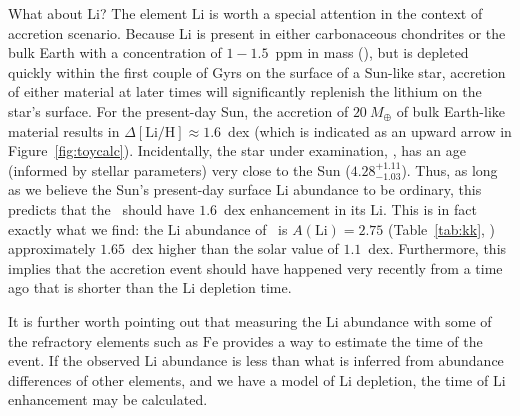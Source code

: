 \documentclass[manuscript]{aastex6}
\newcommand{\figname}{Figure}
\newcommand*\elem[1]{\ensuremath{\mathrm{#1}}}
\newcommand*\elemH[1]{\ensuremath{[\mathrm{#1}/\elem{H}]}}
\newcommand{\bizarreone}{\text{Kronos}}
\newcommand{\mearth}{\ensuremath{M_\oplus}}
\begin{document}

What about \elem{Li}?
The element \elem{Li} is worth a special attention in the context of accretion scenario.
Because Li is present in either carbonaceous chondrites or the bulk Earth with
a concentration of $1-1.5$~ppm in mass (\citealt{mcdonough2001composition}),
but is depleted quickly within the first couple of Gyrs on the surface of a
Sun-like star, accretion of either material at later times will significantly
replenish the lithium on the star's surface.
For the present-day Sun, the accretion of $20~\mearth$ of bulk Earth-like
material results in $\Delta\elemH{Li} \approx 1.6$~dex (which
is indicated as an upward arrow in \figname~\ref{fig:toycalc}).
Incidentally, the star under examination, \bizarreone, has an age (informed by
stellar parameters) very close to the Sun ($4.28_{-1.03}^{+1.11}$).
Thus, as long as we believe the Sun's present-day surface \elem{Li} abundance
to be ordinary, this predicts that the \bizarreone\ should have $1.6$~dex enhancement
in its \elem{Li}.
This is in fact exactly what we find: the \elem{Li} abundance of \bizarreone\ is
$A(\elem{Li}) = 2.75$ (Table~\ref{tab:kk}, \citealt{jmlithium})
approximately $1.65$~dex higher than the solar value of $1.1$~dex.
Furthermore, this implies that the accretion event should have happened very
recently from a time ago that is shorter than the \elem{Li} depletion time.

It is further worth pointing out that measuring the \elem{Li} abundance
with some of the refractory elements such as $\elem{Fe}$
provides a way to estimate the time of the event.
If the observed \elem{Li} abundance is less than what is inferred from
abundance differences of other elements, and
we have a model of \elem{Li} depletion, the time of \elem{Li} enhancement
may be calculated.
\end{document}
